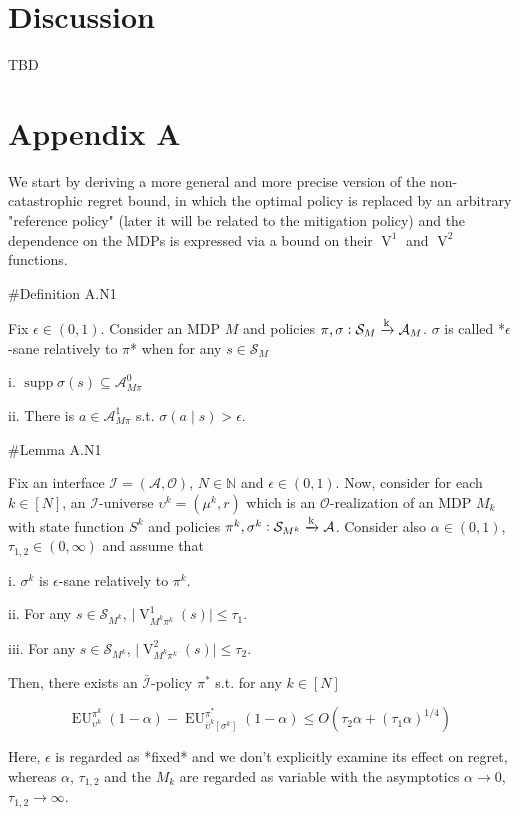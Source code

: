 \documentclass[a4paper]{article}
\DeclareMathOperator{\Supp}{supp}
\newcommand{\AP}[1]{\left(#1\right)}
\newcommand{\AB}[1]{\left[#1\right]}
\newcommand{\Nats}{\mathbb{N}}
\newcommand{\Abs}[1]{\lvert #1 \rvert}
\newcommand{\M}{\xrightarrow{\textnormal{k}}}
\newcommand{\Ob}{\mathcal{O}}
\newcommand{\A}{\mathcal{A}}
\newcommand{\St}{\mathcal{S}}
\newcommand{\In}{\mathcal{I}}
\newcommand{\Adi}{{\bar{\In}}}
\newcommand{\V}{\operatorname{V}}
\newcommand{\EU}{\operatorname{EU}}
\begin{document}
\section{Discussion}

TBD

\section{Appendix A}

We start by deriving a more general and more precise version of the non-catastrophic regret bound, in which the optimal policy is replaced by an arbitrary "reference policy" (later it will be related to the mitigation policy) and the dependence on the MDPs is expressed via a bound on their $\V^1$ and $\V^2$ functions.

\#Definition A.N1

Fix $\epsilon\in(0,1)$. Consider an MDP $M$ and policies $\pi,\sigma: \St_M \M \A_M$. $\sigma$ is called *$\epsilon$-sane relatively to $\pi$* when for any $s \in \St_M$

i. $\Supp{\sigma(s)} \subseteq \A_{M\pi}^0$

ii. There is $a \in \A_{M\pi}^1$ s.t. $\sigma(a \mid s) > \epsilon$.

\#Lemma A.N1

Fix an interface $\In=(\A,\Ob)$, $N \in \Nats$ and $\epsilon \in (0,1)$. Now, consider for each $k \in [N]$, an $\In$-universe $\upsilon^k=(\mu^k,r)$ which is an $\Ob$-realization of an MDP $M_k$ with state function $S^k$ and policies $\pi^k,\sigma^k: \St_{M^k} \M \A$. Consider also $\alpha\in(0,1)$, $\tau_{1,2} \in (0,\infty)$ and assume that 

i. $\sigma^k$ is $\epsilon$-sane relatively to $\pi^k$.

ii. For any $s \in \St_{M^k}$, $\Abs{\V^1_{M^k\pi^k}(s)} \leq \tau_1$.

iii. For any $s \in \St_{M^k}$, $\Abs{\V^2_{M^k\pi^k}(s)} \leq \tau_2$.

Then, there exists an $\Adi$-policy $\pi^*$ s.t. for any $k \in [N]$

$$\EU_{\upsilon^k}^{\pi^k}(1-\alpha) - \EU_{\bar{\upsilon}^k\AB{\sigma^k}}^{\pi^*}(1-\alpha) \leq O\AP{\tau_2 \alpha + (\tau_1 \alpha)^{1/4}}$$

Here, $\epsilon$ is regarded as *fixed* and we don't explicitly examine its effect on regret, whereas $\alpha$, $\tau_{1,2}$ and the $M_k$ are regarded as variable with the asymptotics $\alpha \rightarrow 0$, $\tau_{1,2} \rightarrow \infty$.
\end{document}
